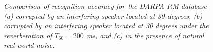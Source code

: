 \documentclass{article}
\begin{document}
\begin{figure}
       \begin{center}
           \vspace{-2mm}
           \vspace{-2mm}
          \vspace{-2mm}
       {\caption{\label{fig:PDCW_AUTO_IntSNR}
        \emph{Comparison of recognition accuracy for the DARPA RM database (a) corrupted by an interfering speaker located at 30 degrees, (b) corrupted by an interfering speaker located at 30 degrees under the reverberation of $T_{60} = 200   $ ms, and (c) in the presence of natural real-world noise.}    
   }}
   \end{center}
   \vspace{-8mm}
\end{figure}
\end{document}
